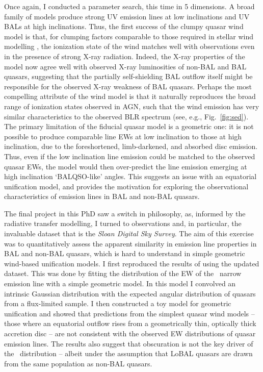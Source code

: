Once again, I conducted a parameter search, this time in 5 dimensions. 
A broad family of models produce strong UV emission lines at low inclinations
and UV BALs at high inclinations. 
Thus, the first success of the clumpy quasar wind model is that,
for clumping factors comparable to those required 
in stellar wind modelling \citep{hamann2008}, the ionization
state of the wind matches well with observations even in the presence
of strong X-ray radiation. Indeed, the X-ray properties of the model now 
agree well with observed X-ray luminosities of non-BAL and BAL quasars, suggesting
that the partially self-shielding BAL outflow itself might be responsible 
for the observed X-ray weakness of BAL quasars. Perhaps the most
compelling attribute of the wind model is that it naturally reproduces
the broad range of ionization states observed in AGN, such that the wind 
emission has very similar characteristics to the observed BLR spectrum 
(see, e.g., Fig.~\ref{fig:sed}). The primary limitation of the fiducial
quasar model is a geometric one: it is not possible to produce comparable
line EWs at low inclination to those at high inclination, due to the
foreshortened, limb-darkened, and absorbed disc emission. Thus, even 
if the low inclination line emission could be matched to the observed quasar EWs,
the model would then over-predict the line emission emerging at high inclination
`BALQSO-like' angles. This suggests an issue with an equatorial unification model,
and provides the motivation for exploring the observational
characteristics of emission lines in BAL and non-BAL quasars.

The final project in this PhD saw a switch in philosophy, as, informed
by the radiative transfer modelling, I turned to observations and, in particular,
the invaluable dataset that is the {\sl Sloan Digital Sky Survey}. 
The aim of this exercise was to quantitatively assess the apparent
similarity in emission line properties in BAL and non-BAL quasars, which is
hard to understand in simple geometric wind-based unification models. I first
reproduced the results of \cite{risaliti2011} using the updated dataset. 
This was done by fitting the distribution of the EW of the \oiiifull\ narrow emission line 
with a simple geometric model. In this model I convolved an intrinsic Gaussian distribution
with the expected angular distribution of quasars from a 
flux-limited sample. I then constructed a toy model for geometric unification
and showed that predictions from the simplest quasar wind models -- 
those where an equatorial outflow rises from a geometrically thin, 
optically thick accretion disc -- are not consistent with the observed 
EW distributions of quasar emission lines. The results also suggest that
obscuration is not the key driver of the \ewo\ distribution -- albeit
under the assumption that LoBAL
quasars are drawn from the same population as non-BAL quasars.

